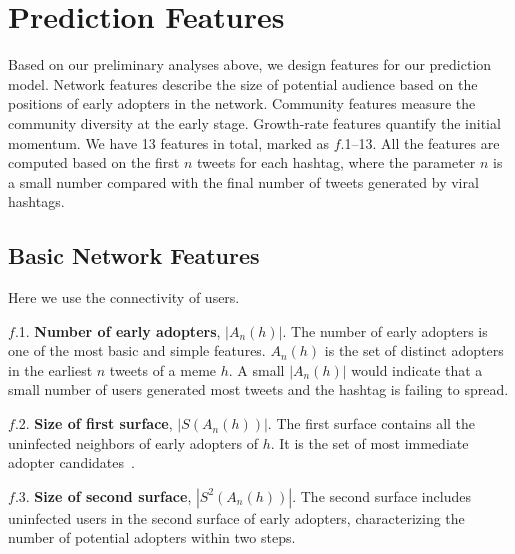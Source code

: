 \documentclass[letterpaper]{article}
\begin{document}
\section{Prediction Features}\label{sec:features}

Based on our preliminary analyses above, we design features for our prediction model. 
Network features describe the size of potential audience based on the positions of early adopters in the network.  
Community features measure the community diversity at the early stage.  
Growth-rate features quantify the initial momentum.  
We have 13 features in total, marked as $f$.1--13. All the features are computed based on the first $n$ tweets for each hashtag, where the parameter $n$ is a small number compared with the final number of tweets generated by viral hashtags.  



\subsection{Basic Network Features}

Here we use the connectivity of users. 


\noindent $f$.1. \textbf{Number of early adopters}, $|A_n(h)|$.  
The number of early adopters is one of the most basic and simple features. 
$A_n(h)$ is the set of distinct adopters in the earliest $n$ tweets of a meme $h$. 
A small $|A_n(h)|$ would indicate that a small number of users generated most tweets and the hashtag is failing to spread. 


\noindent $f$.2. \textbf{Size of first surface}, $| S(A_n(h)) |$. The first surface contains all the uninfected neighbors of early adopters of $h$. It is the set of most immediate adopter candidates~\cite{ma2013predicting}. 


\noindent $f$.3. \textbf{Size of second surface}, $| S^2(A_n(h))  |$. The second surface includes uninfected users in the second surface of early adopters, characterizing the number of potential adopters within two steps. 
\end{document}
